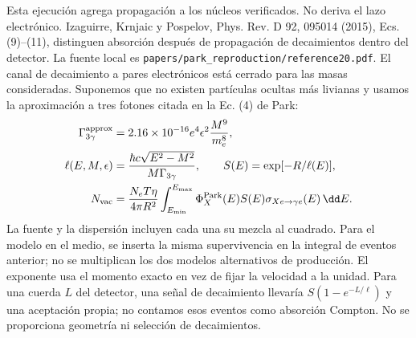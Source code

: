 \section{}
{Esta ejecución agrega propagación a los núcleos verificados. No deriva el lazo electrónico. Izaguirre, Krnjaic y Pospelov, Phys. Rev. D 92, 095014 (2015), Ecs. (9)--(11), distinguen absorción después de propagación de decaimientos dentro del detector. La fuente local es \texttt{papers/park\_reproduction/reference20.pdf}. El canal de decaimiento a pares electrónicos está cerrado para las masas consideradas. Suponemos que no existen partículas ocultas más livianas y usamos la aproximación a tres fotones citada en la Ec. (4) de Park:}
\begin{align}
\Gamma_{3\gamma}^{\rm approx}&=2.16\times10^{-16}e^4\epsilon^2\frac{M^9}{m_e^8},\\
\ell(E,M,\epsilon)&=\frac{\hbar c\sqrt{E^2-M^2}}{M\Gamma_{3\gamma}},\qquad S(E)=\exp[-R/\ell(E)],\\
N_{\rm vac}&=\frac{N_eT\eta}{4\pi R^2}\int_{E_{\min}}^{E_{\max}}\Phi_X^{\rm Park}(E)S(E)\sigma_{Xe\to\gamma e}(E)\,\dd E.
\end{align}
{La fuente y la dispersión incluyen cada una su mezcla al cuadrado. Para el modelo en el medio, se inserta la misma supervivencia en la integral de eventos anterior; no se multiplican los dos modelos alternativos de producción. El exponente usa el momento exacto en vez de fijar la velocidad a la unidad. Para una cuerda $L$ del detector, una señal de decaimiento llevaría $S(1-e^{-L/\ell})$ y una aceptación propia; no contamos esos eventos como absorción Compton. No se proporciona geometría ni selección de decaimientos.}

